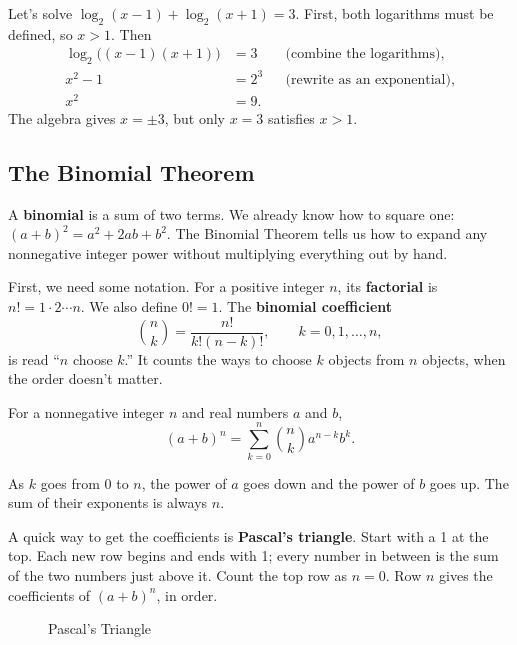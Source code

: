 \begin{exampleblock}
Let's solve $\log_2(x-1)+\log_2(x+1)=3$. First, both logarithms
must be defined, so $x>1$. Then
\begin{align*}
\log_2\bigl((x-1)(x+1)\bigr)&=3
&&\text{(combine the logarithms)},\\
x^2-1&=2^3
&&\text{(rewrite as an exponential)},\\
x^2&=9.
\end{align*}
The algebra gives $x=\pm3$, but only $x=3$ satisfies $x>1$.
\end{exampleblock}

\subsection{The Binomial Theorem}

A \textbf{binomial} is a sum of two terms. We already know how to
square one: $(a+b)^2=a^2+2ab+b^2$. The Binomial Theorem tells us
how to expand any nonnegative integer power without multiplying
everything out by hand.

First, we need some notation. For a positive integer $n$, its
\textbf{factorial} is $n!=1\cdot2\cdots n$. We also define $0!=1$.
The \textbf{binomial coefficient}
$$\binom nk=\frac{n!}{k!(n-k)!},\qquad k=0,1,\ldots,n,$$
is read ``$n$ choose $k$.'' It counts the ways to choose $k$ objects
from $n$ objects, when the order doesn't matter.

\begin{thm}
For a nonnegative integer $n$ and real numbers $a$ and $b$,
$$(a+b)^n=\sum_{k=0}^n\binom nk a^{n-k}b^k.$$
\end{thm}

As $k$ goes from 0 to $n$, the power of $a$ goes down and the power
of $b$ goes up. The sum of their exponents is always $n$.

A quick way to get the coefficients is \textbf{Pascal's triangle}.
Start with a 1 at the top. Each new row begins and ends with 1;
every number in between is the sum of the two numbers just above it.
Count the top row as $n=0$. Row $n$ gives the coefficients of
$(a+b)^n$, in order.

\begin{figure}[H]
\centering

\caption{Pascal's Triangle}
\label{fig:pascal-triangle}
\end{figure} 

